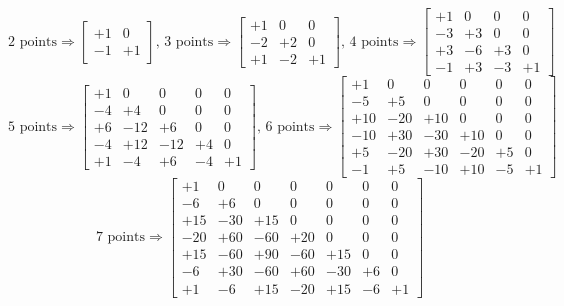 \documentclass{amsart}
\begin{document}
  \pagestyle{empty}

  \begin{equation*}
    \text{2 points} \Rightarrow
    \begin{bmatrix}
      +1 &  0 \\
      -1 & +1
    \end{bmatrix}
    \text{, 3 points} \Rightarrow
    \begin{bmatrix}
      +1 &  0 &  0 \\
      -2 & +2 &  0 \\
      +1 & -2 & +1
    \end{bmatrix}
    \text{, 4 points} \Rightarrow
    \begin{bmatrix}
      +1 &  0 &  0 &  0 \\
      -3 & +3 &  0 &  0 \\
      +3 & -6 & +3 &  0 \\
      -1 & +3 & -3 & +1
    \end{bmatrix}
  \end{equation*}
  \begin{equation*}
    \text{5 points} \Rightarrow
    \begin{bmatrix}
      +1 &   0 &   0 &  0 &  0 \\
      -4 &  +4 &   0 &  0 &  0 \\
      +6 & -12 &  +6 &  0 &  0 \\
      -4 & +12 & -12 & +4 &  0 \\
      +1 &  -4 &  +6 & -4 & +1
    \end{bmatrix}
    \text{, 6 points} \Rightarrow
    \begin{bmatrix}
       +1 &   0 &   0 &   0 &  0 &  0 \\
       -5 &  +5 &   0 &   0 &  0 &  0 \\
      +10 & -20 & +10 &   0 &  0 &  0 \\
      -10 & +30 & -30 & +10 &  0 &  0 \\
       +5 & -20 & +30 & -20 & +5 &  0 \\
       -1 &  +5 & -10 & +10 & -5 & +1
    \end{bmatrix}
  \end{equation*}
  \begin{equation*}
    \text{7 points} \Rightarrow
    \begin{bmatrix}
       +1 &   0 &   0 &   0 &   0 &  0 &  0 \\
       -6 &  +6 &   0 &   0 &   0 &  0 &  0 \\
      +15 & -30 & +15 &   0 &   0 &  0 &  0 \\
      -20 & +60 & -60 & +20 &   0 &  0 &  0 \\
      +15 & -60 & +90 & -60 & +15 &  0 &  0 \\
       -6 & +30 & -60 & +60 & -30 & +6 &  0 \\
       +1 &  -6 & +15 & -20 & +15 & -6 & +1
    \end{bmatrix}
  \end{equation*}
\end{document}
